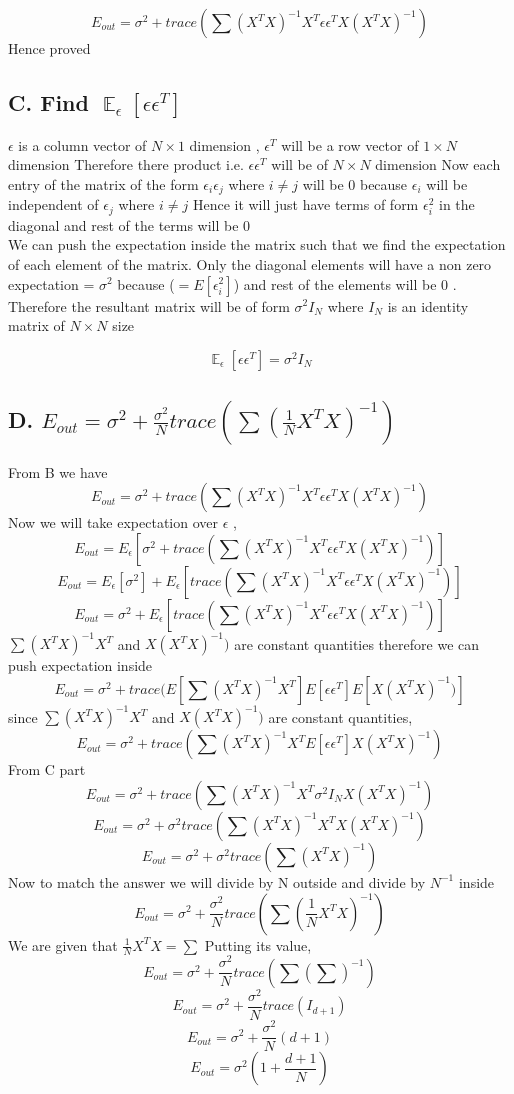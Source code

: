 \documentclass{article}
\DeclareMathOperator{\E}{\mathbb{E}}
\begin{document}
$$E_{out} = \sigma^2 + trace(\sum (X^TX)^{-1}X^T\epsilon\epsilon^TX(X^TX)^{-1})$$
Hence proved 

\subsection{C. Find $\E_{\epsilon}[\epsilon\epsilon^T]$}
$\epsilon$ is a column vector of $N\times1$ dimension , $\epsilon^T $ will be a row vector of $1\times N$ dimension Therefore there product i.e. $\epsilon\epsilon^T$ will be of $N\times N$  dimension
Now each entry of the matrix of the form $\epsilon_i\epsilon_j$ where $i\neq j $ will be 0 because $\epsilon_i$ will be independent of $\epsilon_j$ where $i \neq j$ 
Hence it will just have terms of form $\epsilon_i^2$ in the diagonal and rest of the terms will be 0\\
We can push the expectation inside the matrix such that we find the expectation of each element of the matrix. Only the diagonal elements will have a non zero expectation = $\sigma^2$ because ($=E[\epsilon_i^2]$) and rest of the elements will be 0 .
Therefore the resultant matrix will be of form $\sigma^2I_N$ where $I_N$ is an identity matrix of $N\times N $ size 

$$\E_{\epsilon}[\epsilon\epsilon^T] = \sigma^2I_N$$
\subsection{D. $E_{out}= \sigma^2 + \frac{\sigma^2}{N}trace(\sum(\frac{1}{N}X^TX)^{-1})$}
From B we have 
$$E_{out} = \sigma^2 + trace(\sum (X^TX)^{-1}X^T\epsilon\epsilon^TX(X^TX)^{-1})$$ 
Now we will take expectation over $\epsilon$ ,
$$E_{out} = E_{\epsilon}[\sigma^2 + trace(\sum (X^TX)^{-1}X^T\epsilon\epsilon^TX(X^TX)^{-1})]$$ 
$$E_{out} = E_{\epsilon}[\sigma^2] + E_{\epsilon}[trace(\sum (X^TX)^{-1}X^T\epsilon\epsilon^TX(X^TX)^{-1})]$$ 
$$E_{out} = \sigma^2 + E_{\epsilon}[trace(\sum (X^TX)^{-1}X^T\epsilon\epsilon^TX(X^TX)^{-1})]$$ 
$\sum (X^TX)^{-1}X^T$ and $X(X^TX)^{-1})$ are constant quantities therefore we can push expectation inside 
$$E_{out} = \sigma^2 + trace(E[\sum (X^TX)^{-1}X^T]E[\epsilon\epsilon^T]E[X(X^TX)^{-1})]$$ 
since $\sum (X^TX)^{-1}X^T$ and $X(X^TX)^{-1})$ are constant quantities,
$$E_{out} = \sigma^2 + trace(\sum (X^TX)^{-1}X^TE[\epsilon\epsilon^T]X(X^TX)^{-1})$$ 
From C part
$$E_{out} = \sigma^2 + trace(\sum (X^TX)^{-1}X^T \sigma^2I_NX(X^TX)^{-1})$$ 
$$E_{out} = \sigma^2 + \sigma^2trace(\sum (X^TX)^{-1}X^TX(X^TX)^{-1})$$ 
$$E_{out} = \sigma^2 + \sigma^2trace(\sum (X^TX)^{-1})$$ 
Now to match the answer we will divide by N outside  and divide by $N^{-1}$ inside 
$$E_{out} = \sigma^2 + \frac{\sigma^2}{N}trace(\sum (\frac{1}{N}X^TX)^{-1})$$ 
We are given that $\frac{1}{N}X^TX = \sum$
Putting its value,
$$E_{out} = \sigma^2 + \frac{\sigma^2}{N}trace(\sum (\sum) ^{-1})$$ 
$$E_{out} = \sigma^2 + \frac{\sigma^2}{N}trace(I_{d+1})$$ 
$$E_{out} = \sigma^2 + \frac{\sigma^2}{N}(d+1)$$ 
$$E_{out} = \sigma^2(1 + \frac{d+1}{N})$$ 
\end{document}
